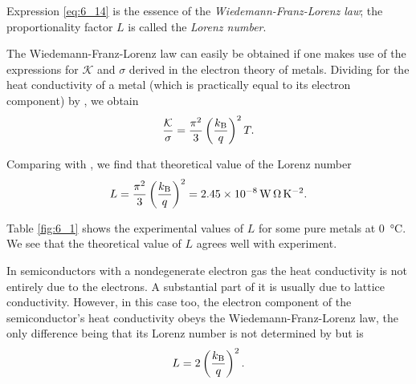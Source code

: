 Expression \eqref{eq:6_14} is the essence of the \textit{Wiedemann-Franz-Lorenz law}; the proportionality factor $L$ is called the \textit{Lorenz number}.

The Wiedemann-Franz-Lorenz law can easily be obtained if one makes use of the expressions for $\mathcal{K}$ and $\sigma$ derived in the electron theory of metals. Dividing  for the heat conductivity of a metal (which is practically equal to its electron component) by , we obtain
\begin{equation}\label{eq:6_15}
    \frac{\mathcal{K}}{\sigma} = \frac{\pi^2}{3} \left(\frac{k_{\text{B}}}{q}\right)^2 T.
\end{equation}

\noindent
Comparing  with , we find that theoretical value of the Lorenz number
\begin{equation}\label{eq:6_16}
    L = \frac{\pi^2}{3} \left(\frac{k_{\text{B}}}{q}\right)^2 = \SI{2.45e-8}{\watt\ohm\per\kelvin\squared}.
\end{equation}

Table \ref{fig:6_1} shows the experimental values of $L$ for some pure metals at \SI{0}{\degreeCelsius}. We see that the theoretical value of $L$ agrees well with experiment.

\begin{table}[!b]
	\renewcommand{\arraystretch}{1.2}
	\caption{}
	\vspace{-0.6cm}
	\label{table:6_1}
	\begin{center}\end{center}
\end{table}

In semiconductors with a nondegenerate electron gas the heat conductivity is not entirely due to the electrons. A substantial part of it is usually due to lattice conductivity. However, in this case too, the electron component of the semiconductor's heat conductivity obeys the Wiedemann-Franz-Lorenz law, the only difference being that its Lorenz number is not determined by  but is
\begin{equation}\label{eq:6_17}
    L = 2 \left(\frac{k_{\text{B}}}{q}\right)^2.
\end{equation}

